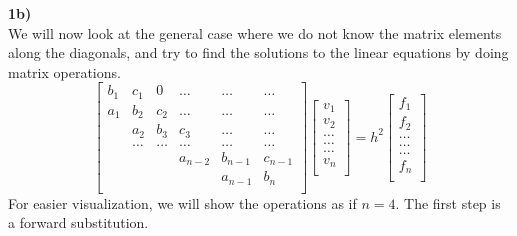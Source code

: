 \documentclass{article}
\begin{document}
\textbf{1b)}\\
We will now look at the general case where we do not know the matrix elements along the diagonals, and try to find the solutions to the linear equations by doing matrix operations. 
\begin{equation}
    \begin{bmatrix}
                           b_1& c_1 & 0 &\dots   & \dots &\dots \\
                           a_1 & b_2 & c_2 &\dots &\dots &\dots \\
                           & a_2 & b_3 & c_3 & \dots & \dots \\
                           & \dots   & \dots &\dots   &\dots & \dots \\
                           &   &  &a_{n-2}  &b_{n-1}& c_{n-1} \\
                           &    &  &   &a_{n-1} & b_n \\
                      \end{bmatrix}\begin{bmatrix}
                           v_1\\
                           v_2\\
                           \dots \\
                          \dots  \\
                          \dots \\
                           v_n\\
                      \end{bmatrix}
  =h^2\begin{bmatrix}
                           f_1\\
                           f_2\\
                           \dots \\
                           \dots \\
                          \dots \\
                           f_n\\
                      \end{bmatrix}
           \end{equation}
For easier visualization, we will show the operations as if $n = 4$. The first step is a forward substitution.
\end{document}
